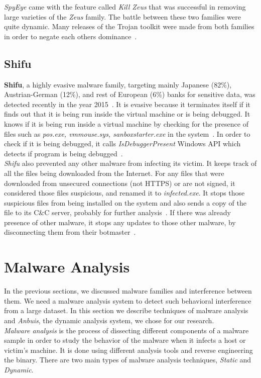 \textit{SpyEye} came with the feature called \emph{Kill Zeus} that was successful in removing large varieties of the \emph{Zeus} family.
The battle between these two families were quite dynamic.
Many releases of the Trojan toolkit were made from both families in order to negate each others dominance~\cite[]{sanszeus}.
\subsection{Shifu}
\label{sub:Shifu}
\textbf{Shifu}, a highly evasive malware family, targeting mainly Japanese (82\%), Austrian-German (12\%), and rest of European (6\%) banks for sensitive data, was detected recently in the year 2015~\cite[]{secintelshifu}.
It is evasive because it terminates itself if it finds out that it is being run inside the virtual machine or is being debugged.
It knows if it is being run inside a virtual machine by checking for the presence of files such as \emph{pos.exe, vmmouse.sys, sanboxstarter.exe} in the system~\cite[]{mccafeshifu}.
In order to check if it is being debugged, it calls \emph{IsDebuggerPresent} Windows API which detects if program is being debugged~\cite[]{mccafeshifu}.\\
\emph{Shifu} also prevented any other malware from infecting its victim.
It keeps track of all the files being downloaded from the Internet.
For any files that were downloaded from unsecured connections (not HTTPS) or are not signed, it considered those files suspicious, and renamed it to \emph{infected.exe}.
It stops those suspicious files from being installed on the system and also sends a copy of the file to its C\&C server, probably for further analysis~\cite[]{secintelshifu}.
If there was already presence of other malware, it stops any updates to those other malware, by disconnecting them from their botmaster~\cite[]{secintelshifu}.
\section{Malware Analysis}
\label{sec:Malware Analysis}
In the previous sections, we discussed malware families and interference between them.
We need a malware analysis system to detect such behavioral interference from a large dataset.
In this section we describe techniques of malware analysis and \emph{Anbuis}, the dynamic analysis system, we chose for our research.\\

\emph{Malware analysis} is the process of dissecting different components of a malware sample in order to study the behavior of the malware when it infects a host or victim's machine.
It is done using different analysis tools and reverse engineering the binary.
There are two main types of malware analysis techniques, \emph{Static} and \emph{Dynamic}.\\

